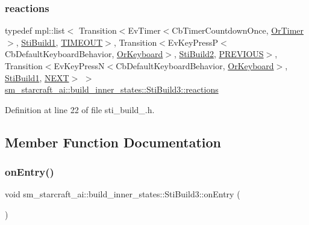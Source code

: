 \subsubsection{\texorpdfstring{reactions}{reactions}}
{\footnotesize\ttfamily typedef mpl\+::list$<$ Transition$<$Ev\+Timer$<$Cb\+Timer\+Countdown\+Once, \hyperlink{classsm__starcraft__ai_1_1OrTimer}{Or\+Timer}$>$, \hyperlink{structsm__starcraft__ai_1_1build__inner__states_1_1StiBuild1}{Sti\+Build1}, \hyperlink{structsm__starcraft__ai_1_1build__inner__states_1_1StiBuild3_1_1TIMEOUT}{T\+I\+M\+E\+O\+UT}$>$, Transition$<$Ev\+Key\+PressP$<$Cb\+Default\+Keyboard\+Behavior, \hyperlink{classsm__starcraft__ai_1_1OrKeyboard}{Or\+Keyboard}$>$, \hyperlink{structsm__starcraft__ai_1_1build__inner__states_1_1StiBuild2}{Sti\+Build2}, \hyperlink{structsm__starcraft__ai_1_1build__inner__states_1_1StiBuild3_1_1PREVIOUS}{P\+R\+E\+V\+I\+O\+US}$>$, Transition$<$Ev\+Key\+PressN$<$Cb\+Default\+Keyboard\+Behavior, \hyperlink{classsm__starcraft__ai_1_1OrKeyboard}{Or\+Keyboard}$>$, \hyperlink{structsm__starcraft__ai_1_1build__inner__states_1_1StiBuild1}{Sti\+Build1}, \hyperlink{structsm__starcraft__ai_1_1build__inner__states_1_1StiBuild3_1_1NEXT}{N\+E\+XT}$>$ $>$ \hyperlink{structsm__starcraft__ai_1_1build__inner__states_1_1StiBuild3_a2b857ab01ffed639b605c5931f610676}{sm\+\_\+starcraft\+\_\+ai\+::build\+\_\+inner\+\_\+states\+::\+Sti\+Build3\+::reactions}}



Definition at line 22 of file sti\+\_\+build\+\_.\+h.



\subsection{Member Function Documentation}
\mbox{\label{structsm__starcraft__ai_1_1build__inner__states_1_1StiBuild3_aa553262d3b05d3e719365fba804cbfe8}} 
\subsubsection{\texorpdfstring{on\+Entry()}{onEntry()}}
{\footnotesize\ttfamily void sm\+\_\+starcraft\+\_\+ai\+::build\+\_\+inner\+\_\+states\+::\+Sti\+Build3\+::on\+Entry (\begin{DoxyParamCaption}{ }\end{DoxyParamCaption})\hspace{0.3cm}{\ttfamily [inline]}}



